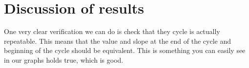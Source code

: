 \documentclass[nofoot,pdf-a,balance,colorlinks,upint,subscriptcorrection,varvw,mathalfa=cal=boondoxo]{asmeconf}
\begin{document}
\begin{table}[H]
        \caption[Table]{Max forces at P - Case 1}\label{tab:pForce1}
    \end{table}
\begin{table}[H]
        \caption[Table]{Max forces at P - Case 2}\label{tab:pForce2}
    \end{table}
\begin{table}[H]
        \caption[Table]{Max forces at P - Case 3}\label{tab:pForce3}
    \end{table}

	\section{Discussion of results}
	One very clear verification we can do is check that they cycle is actually repeatable. This means that the value and slope at the end of the cycle and beginning of the cycle should be equivalent. This is something you can easily see in our graphs holds true, which is good. 
\end{document}
